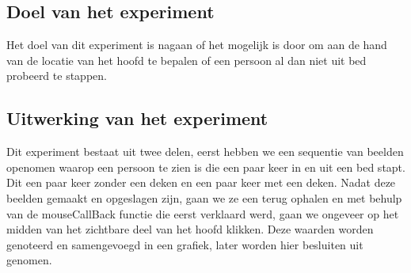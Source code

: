  \subsection{Doel van het experiment}
 \label{ERefHGDD}
 Het doel van dit experiment is nagaan of het mogelijk is door om aan de hand van de locatie van het hoofd te bepalen of een persoon al dan niet uit bed probeerd te stappen. 
 
 \subsection{Uitwerking van het experiment}
 \label{ERefHGDU}
 Dit experiment bestaat uit twee delen, eerst hebben we een sequentie van beelden openomen waarop een persoon te zien is die een paar keer in en uit een bed stapt. Dit een paar keer zonder een deken en een paar keer met een deken. Nadat deze beelden gemaakt en opgeslagen zijn, gaan we ze een terug ophalen en met behulp van de mouseCallBack functie die eerst verklaard werd, gaan we ongeveer op het midden van het zichtbare deel van het hoofd klikken. Deze waarden worden genoteerd en samengevoegd in een grafiek, later worden hier besluiten uit genomen. 
 
